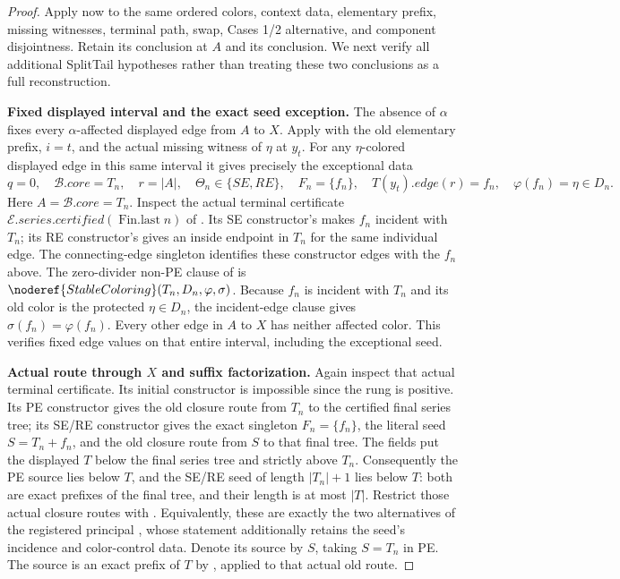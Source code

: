 \begin{proof}
Apply  now to the same ordered colors,
context data, elementary prefix, missing witnesses, terminal path, swap,
Cases 1/2 alternative, and component disjointness. Retain its
 conclusion at $A$ and its
 conclusion. We next verify all additional
SplitTail hypotheses rather than treating these two conclusions as a
full reconstruction.

\textbf{Fixed displayed interval and the exact seed exception.}
The absence of $\alpha$ fixes every $\alpha$-affected displayed edge
from $A$ to $X$. Apply 
with the old elementary prefix, $i=t$, and the actual missing witness
of $\eta$ at $y_t$. For any $\eta$-colored displayed edge in this same
interval it gives precisely the exceptional data
\[
 q=0,\quad\mathcal B.\mathit{core}=T_n,\quad r=|A|,\quad
 \Theta_n\in\{SE,RE\},\quad F_n=\{f_n\},\quad
 T(y_t).\mathit{edge}(r)=f_n,\quad
 \varphi(f_n)=\eta\in D_n.
\]
Here $A=\mathcal B.\mathit{core}=T_n$. Inspect the actual terminal
certificate $\mathcal E.\mathit{series.certified}(\operatorname{Fin.last}n)$
of . Its SE constructor's
 makes $f_n$ incident with $T_n$;
its RE constructor's
 gives an inside endpoint
in $T_n$ for the same individual edge. The connecting-edge singleton
identifies these constructor edges with the $f_n$ above.
The zero-divider non-PE clause of
 is
$\noderef{StableColoring}(T_n,D_n,\varphi,\sigma)$.
Because $f_n$ is incident with $T_n$ and its old color is the protected
$\eta\in D_n$, the incident-edge clause gives
$\sigma(f_n)=\varphi(f_n)$. Every other edge in $A$ to $X$ has neither
affected color. This verifies fixed edge values on that entire interval,
including the exceptional seed.

\textbf{Actual route through $X$ and suffix factorization.}
Again inspect that actual terminal certificate. Its initial constructor
is impossible since the rung is positive. Its PE constructor gives the
old closure route from $T_n$ to the certified final series tree; its
SE/RE constructor gives the exact singleton $F_n=\{f_n\}$, the literal
 seed $S=T_n+f_n$, and the old closure
route from $S$ to that final tree. The
 fields put the displayed $T$ below
the final series tree and strictly above $T_n$. Consequently the PE
source lies below $T$, and the SE/RE seed of length $|T_n|+1$ lies
below $T$: both are exact prefixes of the final tree, and their length
is at most $|T|$. Restrict those actual closure routes with
. Equivalently, these
are exactly the two alternatives of the registered principal
, whose statement additionally retains
the seed's incidence and color-control data. Denote its source by $S$,
taking $S=T_n$ in PE. The source is an exact prefix of $T$ by
, applied to
that actual old route.


\end{proof}
